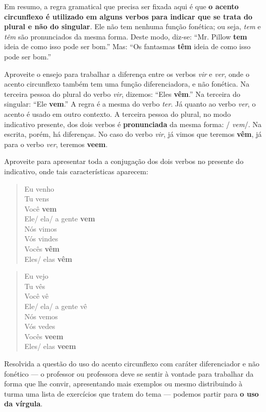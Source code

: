 \documentclass[11pt]{extarticle}
\begin{document}
Em resumo, a regra gramatical que precisa ser fixada aqui é que
\textbf{o acento circunflexo é utilizado em alguns verbos para
indicar que se trata do plural e não do singular}. Ele
não tem nenhuma função fonética; ou seja, \textit{tem} e \textit{têm}
são pronunciados da mesma forma.
Deste modo, diz-se: ``Mr. Pillow \textbf{tem} ideia de como isso pode ser bom.''
Mas: ``Os fantasmas \textbf{têm} ideia de como isso pode ser bom.''

Aproveite o ensejo para trabalhar a diferença entre os verbos \textit{vir}
e \textit{ver}, onde o acento circunflexo também tem uma função 
diferenciadora, e não fonética. 
Na terceira pessoa do plural do verbo \textit{vir}, dizemos: ``Eles \textbf{vêm}.''
Na terceira do singular: ``Ele \textbf{vem}.'' A regra é a mesma do verbo \textit{ter}. 
Já quanto ao verbo \textit{ver}, o acento é usado em outro contexto.
A terceira pessoa do plural, no modo indicativo presente, dos dois verbos
é \textbf{pronunciada} da mesma forma: / \textit{vem}/. Na escrita, porém, há diferenças.
No caso do verbo \textit{vir}, já vimos que teremos \textbf{vêm}, já para
o verbo \textit{ver}, teremos \textbf{veem}. 

Aproveite para apresentar toda a conjugação dos dois verbos no presente do indicativo,
onde tais características aparecem:

\begin{verse}
Eu venho\\
Tu vens\\
Você \textbf{vem}\\
Ele/ ela/ a gente \textbf{vem}\\
Nós vimos\\
Vós vindes\\
Vocês \textbf{vêm}\\
Eles/ elas \textbf{vêm}\\
\end{verse}

\begin{verse}
Eu vejo\\
Tu vês\\
Você vê\\
Ele/ ela/ a gente vê\\
Nós vemos\\
Vós vedes\\
Vocês \textbf{veem}\\
Eles/ elas \textbf{veem}\\
\end{verse}

Resolvida a questão do uso do acento circunflexo com caráter diferenciador e não fonético
--- o professor ou professora deve se sentir à vontade para trabalhar da forma que lhe convir,
apresentando mais exemplos ou mesmo distribuindo à turma uma lista de exercícios que tratem do tema ---
podemos partir para \textbf{o uso da vírgula}.
\end{document}
